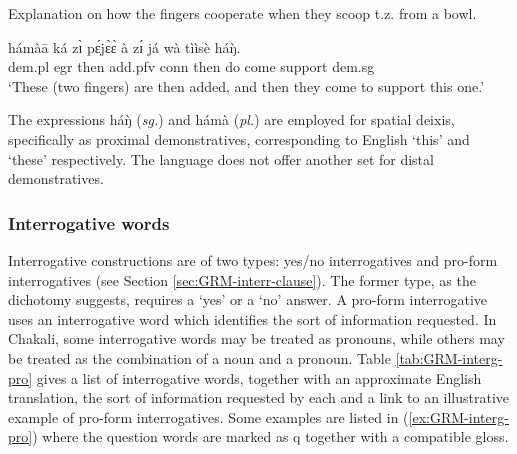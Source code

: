\begin{exe}
\begin{exe}
\begin{exe}
{\begin{exe}
\begin{exe}
\begin{exe}
\begin{exe}
\begin{exe}
\begin{exe}
\begin{exe}
\ea\label{ex:GRM-demons-pro-quest}{\rm Explanation on how the fingers cooperate
when they scoop t.z. from a bowl.}

 \gll hámàā ká zɪ̀ pɛ́jɛ̀ɛ̀ à zɪ́ já wà tììsè  háŋ̀.\\
 {\sc dem.pl} {\sc egr} then add.{\sc pfv} {\sc conn}  then do come support {\sc
dem.sg}\\
 
\glt `These (two fingers) are then added,
and then they come to support  this one.' 

\z



The expressions {\sls háŋ̀} ({\it sg.}) and {\sls hámà}
({\it pl.}) are employed for spatial deixis, specifically as proximal
demonstratives, corresponding to English `this' and `these' respectively. The
language does not offer another set for distal demonstratives.



\subsubsection{Interrogative words}
\label{sec:GRM-interg-pro}


Interrogative constructions are of two types:  yes/no interrogatives and  pro-form interrogatives 
(see Section \ref{sec:GRM-interr-clause}). The former type, as the dichotomy suggests, requires  
a `yes' or a `no' answer.  A pro-form interrogative  uses  an interrogative word which identifies 
the sort of information requested. In Chakali,  some interrogative words may be treated as 
pronouns, while others may be treated as the combination of a noun and a pronoun.  Table 
\ref{tab:GRM-interg-pro} gives a list of interrogative words, together with an approximate English 
translation,  the sort of information requested by each  and a link to an illustrative example of 
pro-form interrogatives.  Some examples are listed in (\ref{ex:GRM-interg-pro}) where the question 
words are marked as  {\sc q}  together with a compatible gloss.



\end{exe}
\end{exe}
\end{exe}
\end{exe}
\end{exe}
\end{exe}
\end{exe}}
\end{exe}
\end{exe}
\end{exe}
